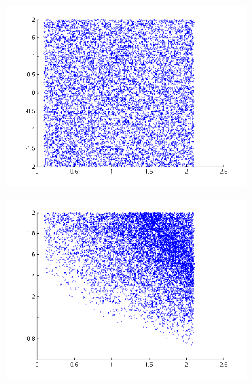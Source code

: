 \documentclass[letterpaper]{article}
\newcommand{\nn}{0.16}
\begin{document}
\begin{figure}
\begin{center}
\begin{subfigure}[b]{\nn\textwidth}
                \includegraphics[width=1\textwidth]{Figs/col_m1_v1.png}
                \caption{}
                \label{fig:mom1}
        \end{subfigure}%
%
\begin{subfigure}[b]{\nn\textwidth}
                \includegraphics[width=1\textwidth]{Figs/col_m1v1_p3.png}
                \caption{}
                \label{fig:mom2}
        \end{subfigure}%

\end{center}
\end{figure}
\end{document}
